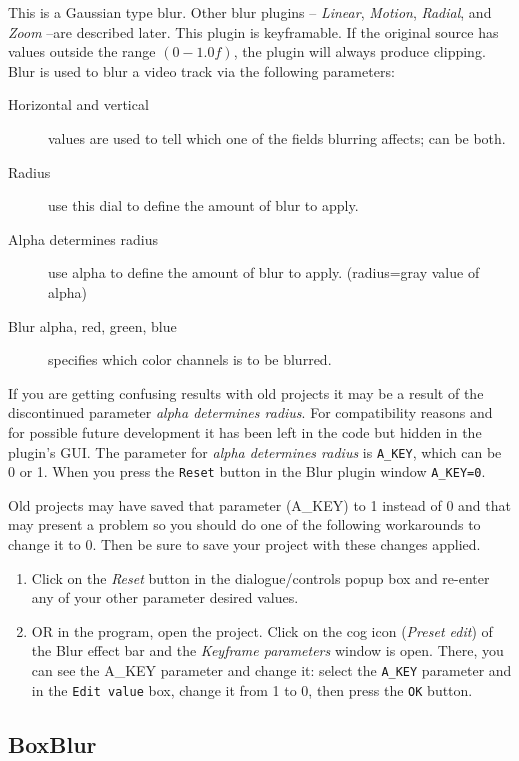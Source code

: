 This is a Gaussian type blur. Other blur plugins -- \textit{Linear}, \textit{Motion}, \textit{Radial}, and \textit{Zoom} --are described later. This plugin is keyframable. If the original source has values outside the range $(0 -1.0f)$, the plugin will always produce clipping. Blur is used to blur a video track via the following parameters:
\begin{description}
    \item[Horizontal and vertical] values are used to tell which one of the fields blurring affects; can be both.
    \item[Radius] use this dial to define the amount of blur to apply.
    \item[Alpha determines radius] use alpha to define the amount of blur to apply. (radius=gray value of alpha)
    \item[Blur alpha, red, green, blue] specifies which color channels is to be blurred.
\end{description}
If you are getting confusing results with old projects it may be a
result of the discontinued parameter \textit{alpha determines radius}.
For compatibility reasons and for possible future development it
has been left in the code but hidden in the plugin's GUI.
The parameter for \textit{alpha determines radius} is
\texttt{A\_KEY}, which can be 0 or 1. When you press the
\texttt{Reset} button in the Blur plugin window \texttt{A\_KEY=0}.

Old projects may have saved that parameter (A\_KEY) to 1 instead 
of 0 and that may present a problem so you should do one of
the following workarounds to change it to 0.  Then be sure to save
your project with these changes applied.
\begin{enumerate}
    \item Click on the \textit{Reset} button in the dialogue/controls popup box and re-enter any of your other parameter desired values.
    \item OR in the \CGG{} program, open the project. Click on the cog icon
(\textit{Preset edit}) of the Blur effect bar and the \textit{Keyframe
parameters} window is open. There, you can see the A\_KEY parameter
and change it: select the \texttt{A\_KEY} parameter and in the
\texttt{Edit value} box, change it from 1 to 0, then press the \texttt{OK}
button.
\end{enumerate}

\subsection{BoxBlur}%
\label{sub:boxblur}

